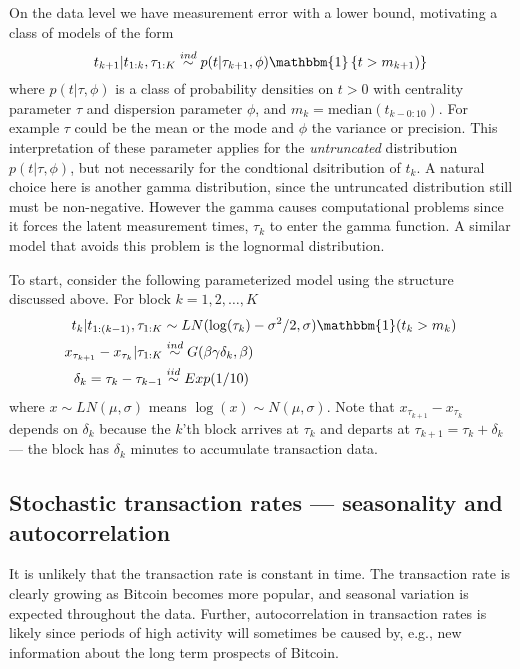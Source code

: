 \documentclass{article}
\begin{document}
On the data level we have measurement error with a lower bound, motivating a class of models of the form 
\[
t_{k+1} |t_{1:k}, \tau_{1:K} \stackrel{ind}{\sim} p(t|\tau_{k+1}, \phi)\mathbbm{1}\left\{t > m_{k+1})\right\}
\]
where $p(t|\tau,\phi)$ is a class of probability densities on $t>0$ with centrality parameter $\tau$ and dispersion parameter $\phi$, and $m_k = \mathrm{median}(t_{k - 0:10})$. For example $\tau$ could be the mean or the mode and $\phi$ the variance or precision. This interpretation of these parameter applies for the {\it untruncated} distribution $p(t|\tau,\phi)$, but not necessarily for the condtional dsitribution of $t_k$. A natural choice here is another gamma distribution, since the untruncated distribution still must be non-negative. However the gamma causes computational problems since it forces the latent measurement times, $\tau_k$ to enter the gamma function. A similar model that avoids this problem is the lognormal distribution.

To start, consider the following parameterized model using the structure discussed above. For block $k=1,2,\dots,K$
\begin{align*}
t_k|t_{1:(k-1)}, \tau_{1:K} &\sim LN(\log(\tau_k) - \sigma^2/2, \sigma)\mathbbm{1}(t_k > m_k)\\
x_{\tau_{k+1}} - x_{\tau_{k}}|\tau_{1:K} & \stackrel{ind}{\sim} G(\beta\gamma\delta_k,\beta)\\
\delta_{k} = \tau_{k} - \tau_{k-1} &\stackrel{iid}{\sim} Exp(1/10)
\end{align*}
where $x\sim LN(\mu,\sigma)$ means $\log(x) \sim N(\mu,\sigma)$. Note that $x_{\tau_{k+1}} - x_{\tau_k}$ depends on $\delta_k$ because the $k$'th block arrives at $\tau_k$ and departs at $\tau_{k+1}=\tau_k + \delta_k$ --- the block has $\delta_k$ minutes to accumulate transaction data.

\subsection{Stochastic transaction rates --- seasonality and autocorrelation}
It is unlikely that the transaction rate is constant in time. The transaction rate is clearly growing as Bitcoin becomes more popular, and seasonal variation is expected throughout the data. Further, autocorrelation in transaction rates is likely since periods of high activity will sometimes be caused by, e.g., new information about the long term prospects of Bitcoin.
\end{document}
